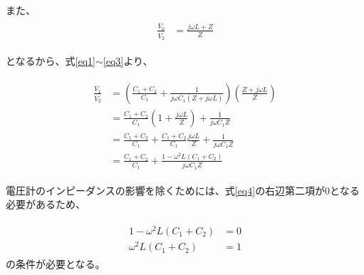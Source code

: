 \documentclass[a4paper,11pt]{jsarticle}
\begin{document}
また、
\begin{align}
  \begin{split}
    \frac{\dot{V_{0}}}{\dot{V_{2}}}
    &=\frac{j\omega L+Z}{Z}
    \label{eq3}
  \end{split}
\end{align}

となるから、式\eqref{eq1}$\sim $\eqref{eq3}より、

\begin{align}
  \begin{split}
    \frac{\dot{V_{1}}}{\dot{V_{2}}}
    &=\left(\frac{C_{1}+C_{2}}{C_{1}}+\frac{1}{j\omega C_{1}(Z+j\omega L)}\right)\left(\frac{Z+j\omega L}{Z}\right)\\
    &=\frac{C_{1}+C_{2}}{C_{1}}\left(1+\frac{j\omega L}{Z}\right)+\frac{1}{j\omega C_{1}Z}\\
    &=\frac{C_{1}+C_{2}}{C_{1}}+\frac{C_{1}+C_{2}}{C_{1}}\frac{j\omega L}{Z}+\frac{1}{j\omega C_{1}Z}\\
    &=\frac{C_{1}+C_{2}}{C_{1}}+\frac{1-\omega ^{2}L(C_{1}+C_{2})}{j\omega C_{1}Z}
    \label{eq4}
  \end{split}
\end{align}

電圧計のインピーダンスの影響を除くためには、式\eqref{eq4}の右辺第二項が0となる必要があるため、

\begin{align}
  \begin{split}
    1-\omega ^{2}L(C_{1}+C_{2})
    &=0\\
    \omega ^{2}L(C_{1}+C_{2})
    &=1
    \label{eq5}
  \end{split}
\end{align}
の条件が必要となる。
\end{document}
